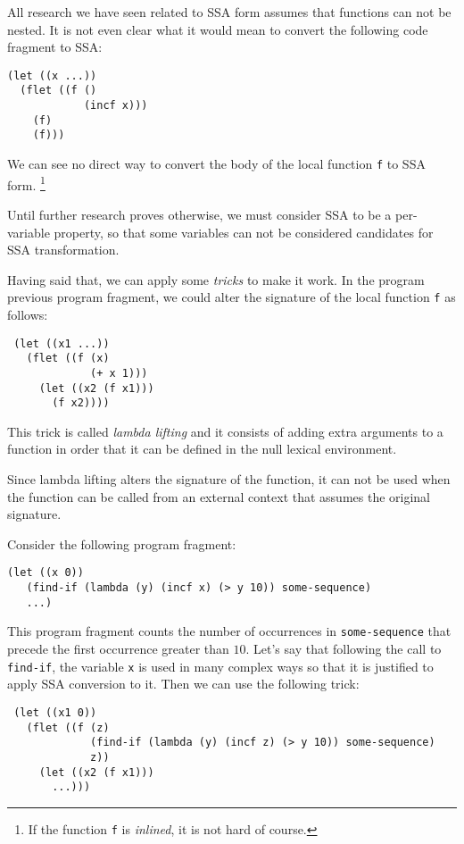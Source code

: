 All research we have seen related to SSA form assumes that functions
can not be nested.  It is not even clear what it would mean to convert
the following code fragment to SSA:

\begin{verbatim}
(let ((x ...))
  (flet ((f ()
            (incf x)))
    (f)
    (f)))
\end{verbatim}

We can see no direct way to convert the body of the local function
\texttt{f} to SSA form.%
\footnote{If the function \texttt{f} is \emph{inlined}, it is not hard
  of course.}

Until further research proves otherwise, we must consider SSA to be a
per-variable property, so that some variables can not be considered
candidates for SSA transformation.

Having said that, we can apply some \emph{tricks} to make it work.  In
the program previous program fragment, we could alter the signature of
the local function \texttt{f} as follows:

\begin{verbatim}
 (let ((x1 ...))
   (flet ((f (x)
             (+ x 1)))
     (let ((x2 (f x1)))
       (f x2))))
\end{verbatim}

This trick is called \emph{lambda lifting} and it consists of adding
extra arguments to a function in order that it can be defined in the
null lexical environment.  

Since lambda lifting alters the signature of the function, it can not
be used when the function can be called from an external context that
assumes the original signature. 

Consider the following program fragment:

\begin{verbatim}
(let ((x 0))
   (find-if (lambda (y) (incf x) (> y 10)) some-sequence)
   ...)
\end{verbatim}

This program fragment counts the number of occurrences in
\texttt{some-sequence} that precede the first occurrence greater than
$10$.  Let's say that following the call to \texttt{find-if}, the
variable \texttt{x} is used in many complex ways so that it is
justified to apply SSA conversion to it.  Then we can use the
following trick:

\begin{verbatim}
 (let ((x1 0))
   (flet ((f (z)
             (find-if (lambda (y) (incf z) (> y 10)) some-sequence)
             z))
     (let ((x2 (f x1)))
       ...)))
\end{verbatim}

